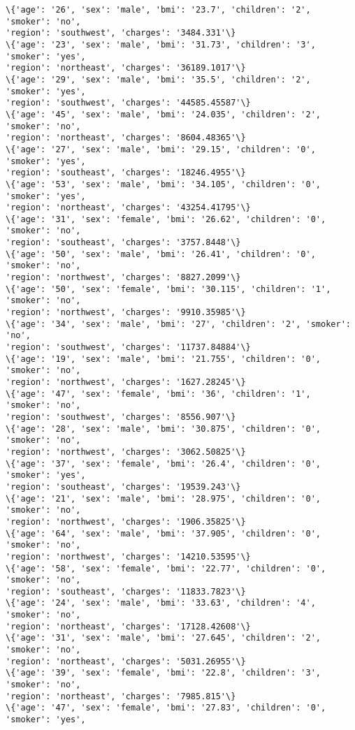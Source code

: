 \documentclass[11pt]{article}
\begin{document}
\begin{Verbatim}[commandchars=\\\{\}]
\{'age': '26', 'sex': 'male', 'bmi': '23.7', 'children': '2', 'smoker': 'no',
'region': 'southwest', 'charges': '3484.331'\}
\{'age': '23', 'sex': 'male', 'bmi': '31.73', 'children': '3', 'smoker': 'yes',
'region': 'northeast', 'charges': '36189.1017'\}
\{'age': '29', 'sex': 'male', 'bmi': '35.5', 'children': '2', 'smoker': 'yes',
'region': 'southwest', 'charges': '44585.45587'\}
\{'age': '45', 'sex': 'male', 'bmi': '24.035', 'children': '2', 'smoker': 'no',
'region': 'northeast', 'charges': '8604.48365'\}
\{'age': '27', 'sex': 'male', 'bmi': '29.15', 'children': '0', 'smoker': 'yes',
'region': 'southeast', 'charges': '18246.4955'\}
\{'age': '53', 'sex': 'male', 'bmi': '34.105', 'children': '0', 'smoker': 'yes',
'region': 'northeast', 'charges': '43254.41795'\}
\{'age': '31', 'sex': 'female', 'bmi': '26.62', 'children': '0', 'smoker': 'no',
'region': 'southeast', 'charges': '3757.8448'\}
\{'age': '50', 'sex': 'male', 'bmi': '26.41', 'children': '0', 'smoker': 'no',
'region': 'northwest', 'charges': '8827.2099'\}
\{'age': '50', 'sex': 'female', 'bmi': '30.115', 'children': '1', 'smoker': 'no',
'region': 'northwest', 'charges': '9910.35985'\}
\{'age': '34', 'sex': 'male', 'bmi': '27', 'children': '2', 'smoker': 'no',
'region': 'southwest', 'charges': '11737.84884'\}
\{'age': '19', 'sex': 'male', 'bmi': '21.755', 'children': '0', 'smoker': 'no',
'region': 'northwest', 'charges': '1627.28245'\}
\{'age': '47', 'sex': 'female', 'bmi': '36', 'children': '1', 'smoker': 'no',
'region': 'southwest', 'charges': '8556.907'\}
\{'age': '28', 'sex': 'male', 'bmi': '30.875', 'children': '0', 'smoker': 'no',
'region': 'northwest', 'charges': '3062.50825'\}
\{'age': '37', 'sex': 'female', 'bmi': '26.4', 'children': '0', 'smoker': 'yes',
'region': 'southeast', 'charges': '19539.243'\}
\{'age': '21', 'sex': 'male', 'bmi': '28.975', 'children': '0', 'smoker': 'no',
'region': 'northwest', 'charges': '1906.35825'\}
\{'age': '64', 'sex': 'male', 'bmi': '37.905', 'children': '0', 'smoker': 'no',
'region': 'northwest', 'charges': '14210.53595'\}
\{'age': '58', 'sex': 'female', 'bmi': '22.77', 'children': '0', 'smoker': 'no',
'region': 'southeast', 'charges': '11833.7823'\}
\{'age': '24', 'sex': 'male', 'bmi': '33.63', 'children': '4', 'smoker': 'no',
'region': 'northeast', 'charges': '17128.42608'\}
\{'age': '31', 'sex': 'male', 'bmi': '27.645', 'children': '2', 'smoker': 'no',
'region': 'northeast', 'charges': '5031.26955'\}
\{'age': '39', 'sex': 'female', 'bmi': '22.8', 'children': '3', 'smoker': 'no',
'region': 'northeast', 'charges': '7985.815'\}
\{'age': '47', 'sex': 'female', 'bmi': '27.83', 'children': '0', 'smoker': 'yes',

\end{Verbatim}
\end{document}
